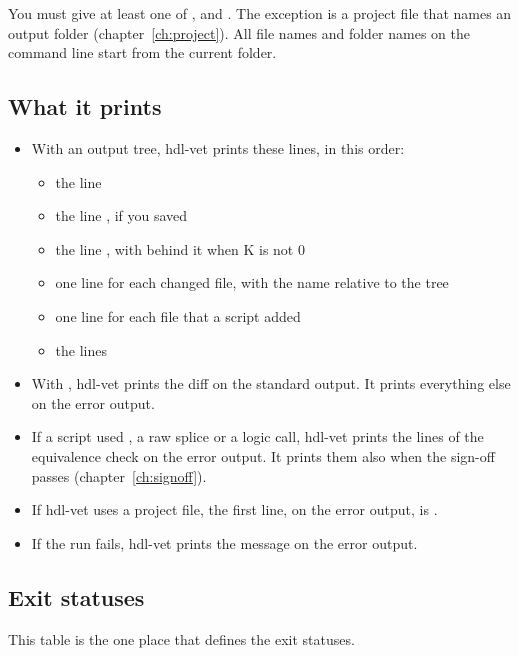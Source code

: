 You must give at least one of ,  and . The exception
is a project file that names an output folder (chapter~\ref{ch:project}). All file names
and folder names on the command line start from the current folder.

\subsection*{What it prints}

\begin{itemize}
\item With an output tree, hdl-vet prints these lines, in this order:
  \begin{itemize}
  \item the line 
  \item the line , if you saved
  \item the line , with  behind it when K is not 0
  \item one line  for each changed file, with the name relative to the
    tree
  \item one line  for each file that a script added
  \item the  lines
  \end{itemize}
\item With , hdl-vet prints the diff on the standard output. It prints
  everything else on the error output.
\item If a script used , a raw splice or a logic call,
  hdl-vet prints the lines of the
  equivalence check on the error output. It prints them also when the sign-off passes
  (chapter~\ref{ch:signoff}).
\item If hdl-vet uses a project file, the first line, on the error output, is
  .
\item If the run fails, hdl-vet prints the message on the error output.
\end{itemize}

\subsection*{Exit statuses}

This table is the one place that defines the exit statuses.

